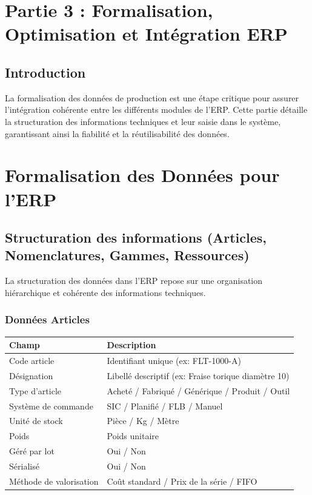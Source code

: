 \documentclass{article}
\begin{document}
\begin{table}[h]
\section*{Partie 3 : Formalisation, Optimisation et Intégration ERP}

\subsection*{Introduction}

La formalisation des données de production est une étape critique pour assurer l'intégration cohérente entre les différents modules de l'ERP. Cette partie détaille la structuration des informations techniques et leur saisie dans le système, garantissant ainsi la fiabilité et la réutilisabilité des données.


\section{Formalisation des Données pour l'ERP}

\subsection{Structuration des informations (Articles, Nomenclatures, Gammes, Ressources)}

La structuration des données dans l'ERP repose sur une organisation hiérarchique et cohérente des informations techniques.

\subsubsection{Données Articles}

\begin{tcolorbox}[colback=blueclair, colframe=blue!70!black, title=Structure type d'une fiche article ERP]
\begin{tabular}{|l|l|}
\hline
\textbf{Champ} & \textbf{Description} \\
\hline
Code article & Identifiant unique (ex: \textsc{FLT-1000-A}) \\
Désignation & Libellé descriptif (ex: Fraise torique diamètre 10) \\
Type d'article & Acheté / Fabriqué / Générique / Produit / Outil \\
Système de commande & SIC / Planifié / FLB / Manuel \\
Unité de stock & Pièce / Kg / Mètre \\
Poids & Poids unitaire \\
Géré par lot & Oui / Non \\
Sérialisé & Oui / Non \\
Méthode de valorisation & Coût standard / Prix de la série / FIFO \\
\hline
\end{tabular}
\end{tcolorbox}


\end{table}
\end{document}
